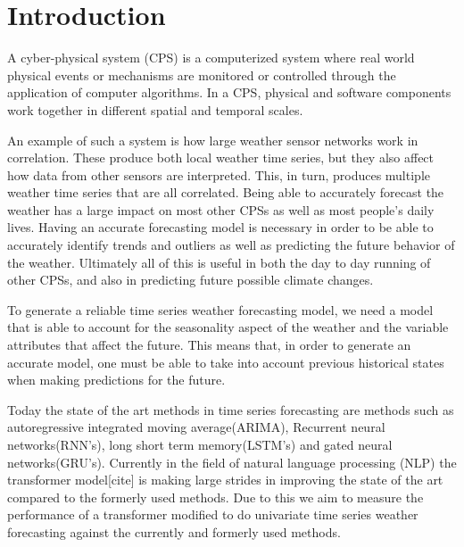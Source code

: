 \section{Introduction}
\label{sec:intro}
A cyber-physical system (CPS) is a computerized system where real world physical events or mechanisms are monitored or controlled through the application of computer algorithms.
In a CPS, physical and software components work together in different spatial and temporal scales.

An example of such a system is how large weather sensor networks work in correlation. These produce both local weather time series, but they also affect how data from other sensors are interpreted. This, in turn, produces multiple weather time series that are all correlated. Being able to accurately forecast the weather has a large impact on most other CPSs as well as most people's daily lives. Having an accurate forecasting model is necessary in order to be able to accurately identify trends and outliers as well as predicting the future behavior of the weather. Ultimately all of this is useful in both the day to day running of other CPSs, and also in predicting future possible climate changes. 

To generate a reliable time series weather forecasting model, we need a model that is able to account for the seasonality aspect of the weather and the variable attributes that affect the future. 
This means that, in order to generate an accurate model, one must be able to take into account previous historical states when making predictions for the future. 

Today the state of the art methods in time series forecasting are methods such as autoregressive integrated moving average(ARIMA), Recurrent neural networks(RNN's), long short term memory(LSTM's) and gated neural networks(GRU's). Currently in the field of natural language processing (NLP) the transformer model[cite] is making large strides in improving the state of the art compared to the formerly used methods. Due to this we aim to measure the performance of a transformer modified to do univariate time series weather forecasting against the currently and formerly used methods. 

